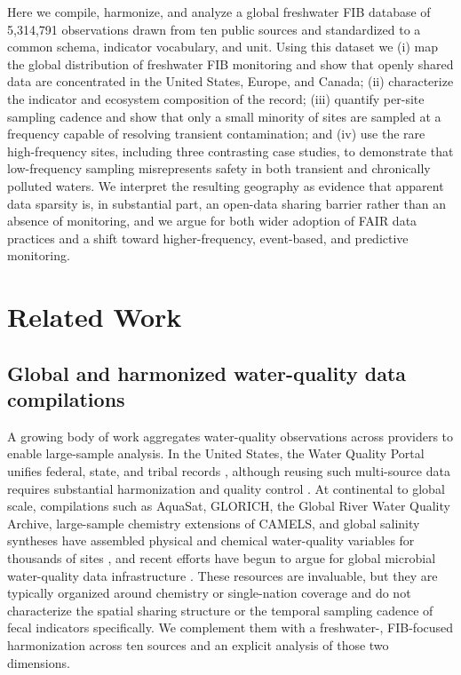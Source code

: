 \documentclass[draft]{agujournal2019}
\begin{document}
Here we compile, harmonize, and analyze a global freshwater FIB database of 5{,}314{,}791 observations drawn from ten public sources and standardized to a common schema, indicator vocabulary, and unit. Using this dataset we (i) map the global distribution of freshwater FIB monitoring and show that openly shared data are concentrated in the United States, Europe, and Canada; (ii) characterize the indicator and ecosystem composition of the record; (iii) quantify per-site sampling cadence and show that only a small minority of sites are sampled at a frequency capable of resolving transient contamination; and (iv) use the rare high-frequency sites, including three contrasting case studies, to demonstrate that low-frequency sampling misrepresents safety in both transient and chronically polluted waters. We interpret the resulting geography as evidence that apparent data sparsity is, in substantial part, an open-data sharing barrier rather than an absence of monitoring, and we argue for both wider adoption of FAIR data practices \cite{wilkinson2016fair} and a shift toward higher-frequency, event-based, and predictive monitoring.

\section{Related Work}

\subsection{Global and harmonized water-quality data compilations}
A growing body of work aggregates water-quality observations across providers to enable large-sample analysis. In the United States, the Water Quality Portal unifies federal, state, and tribal records \cite{read2017water}, although reusing such multi-source data requires substantial harmonization and quality control \cite{sprague2017challenges,bousquin2024harmonizewq}. At continental to global scale, compilations such as AquaSat, GLORICH, the Global River Water Quality Archive, large-sample chemistry extensions of CAMELS, and global salinity syntheses have assembled physical and chemical water-quality variables for thousands of sites \cite{ross2019aquasat,hartmann2014brief,virro2021grqa,sterle2024camelschem,thorslund2020global}, and recent efforts have begun to argue for global microbial water-quality data infrastructure \cite{rose2023global,bain2014global}. These resources are invaluable, but they are typically organized around chemistry or single-nation coverage and do not characterize the spatial sharing structure or the temporal sampling cadence of fecal indicators specifically. We complement them with a freshwater-, FIB-focused harmonization across ten sources and an explicit analysis of those two dimensions.
\end{document}
